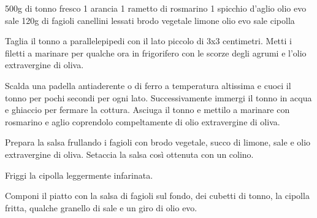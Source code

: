 \begin{ingreds}
	500g di tonno fresco
	1 arancia
	1 rametto di rosmarino
	1 spicchio d'aglio
	olio evo
	sale
\columnbreak
{}
	120g di fagioli canellini lessati
	brodo vegetale
	limone
	olio evo
	sale
	cipolla
\end{ingreds}

\begin{method}

Taglia il tonno a parallelepipedi con il lato piccolo di 3x3 centimetri. Metti i filetti a marinare per qualche ora in frigorifero con le scorze degli agrumi e l'olio extravergine di oliva.

Scalda una padella antiaderente o di ferro a temperatura altissima e cuoci il tonno per pochi secondi per ogni lato. Successivamente immergi il tonno in acqua e ghiaccio per fermare la cottura. Asciuga il tonno e mettilo a marinare con rosmarino e aglio coprendolo compeltamente di olio extravergine di oliva.

Prepara la salsa frullando i fagioli con brodo vegetale, succo di limone, sale e olio extravergine di oliva. Setaccia la salsa così ottenuta con un colino.

Friggi la cipolla leggermente infarinata.

Componi il piatto con la salsa di fagioli sul fondo, dei cubetti di tonno, la cipolla fritta, qualche granello di sale e un giro di olio evo.
\end {method}
